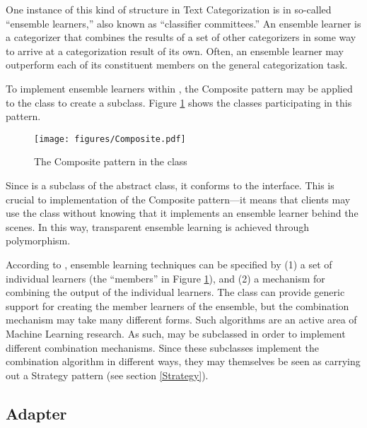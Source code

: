One instance of this kind of structure in Text Categorization is in
so-called ``ensemble learners,'' also known as ``classifier
committees.''  An ensemble learner is a categorizer that combines the
results of a set of other categorizers in some way to arrive at a
categorization result of its own. \cite[p. 30]{sebastiani:02} Often,
an ensemble learner may outperform each of its constituent members on
the general categorization task.  \cite{tumer:98}

To implement ensemble learners within \aicat, the Composite
pattern may be applied to the  class to create a
 subclass.  Figure \ref{Composite-ensemble}
shows the classes participating in this pattern.

\begin{figure}
\texttt{[image: figures/Composite.pdf]}
\caption{The Composite pattern in the  class}
\label{Composite-ensemble}
\end{figure}

Since  is a subclass of the abstract
 class, it conforms to the  interface.
This is crucial to implementation of the Composite pattern---it means
that clients may use the  class without
knowing that it implements an ensemble learner behind the scenes.  In
this way, transparent ensemble learning is achieved through
polymorphism.

According to \cite[p. 30]{sebastiani:02}, ensemble learning techniques
can be specified by (1) a set of individual learners (the ``members''
in Figure \ref{Composite-ensemble}), and (2) a mechanism for combining
the output of the individual learners.  The 
class can provide generic support for creating the member learners of
the ensemble, but the combination mechanism may take many different
forms.  Such algorithms are an active area of Machine Learning
research.  As such,  may be subclassed in
order to implement different combination mechanisms.  Since these
subclasses implement the combination algorithm in different ways, they
may themselves be seen as carrying out a Strategy pattern (see section
\ref{Strategy}).


\subsection{Adapter}


